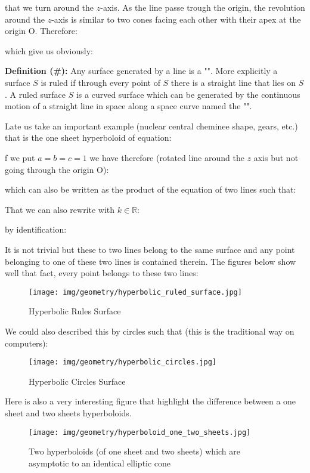 {	that we turn around the $z$-axis. As the line passe trough the origin, the revolution around the $z$-axis is similar to two cones facing each other with their apex at the origin O. Therefore:
	
	which give us obviously:
	
	\textbf{Definition (\#\mydef):} Any surface generated by a line is a "". More explicitly a surface $S$ is ruled if through every point of $S$ there is a straight line that lies on $S$. A ruled surface $S$ is a curved surface which can be generated by the continuous motion of a straight line in space along a space curve named the "".
	
	Late us take an important example (nuclear central cheminee shape, gears, etc.) that is the one sheet hyperboloid of equation:
	
	f we put $a=b=c=1$ we have therefore (rotated line around the $z$ axis but not going through the origin O):
	
	which can also be written as the product of the equation of two lines such that:
	
	That we can also rewrite with $k \in \mathbb{R}$:
	
	by identification:
	
	It is not trivial but these to two lines belong to the same surface and any point belonging to one of these two lines is contained therein. The figures below show well that fact, every point belongs to these two lines:
	\begin{figure}[H]
		\centering
		\texttt{[image: img/geometry/hyperbolic\_ruled\_surface.jpg]}
		\caption{Hyperbolic Rules Surface}
	\end{figure}
	We could also described this by circles such that (this is the traditional way on computers):
	
	\begin{figure}[H]
		\centering
		\texttt{[image: img/geometry/hyperbolic\_circles.jpg]}
		\caption{Hyperbolic Circles Surface}
	\end{figure}
	Here is also a very interesting figure that highlight the difference between a one sheet and two sheets hyperboloids.
	\begin{figure}[H]
		\centering
		\texttt{[image: img/geometry/hyperboloid\_one\_two\_sheets.jpg]}
		\caption{Two hyperboloids (of one sheet and two sheets) which are asymptotic to an identical elliptic cone}
	\end{figure}
	
}
